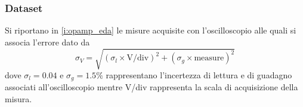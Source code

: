 \documentclass[a4paper,11pt]{article} %
\begin{document}

\subsubsection{Dataset}
Si riportano in  \autoref{i:opamp_eda} le misure acquisite con l'oscilloscopio alle quali si associa l'errore dato da
\begin{equation}\label{e:osc}
	\sigma_{V} = \sqrt{ (\sigma_{l}\times\text{V/div})^2 + (\sigma_{g}\times\text{measure})^2 }
\end{equation}
\noindent dove $\sigma_{l}=0.04$ e $\sigma_{g}=1.5\%$ rappresentano l'incertezza di lettura e di guadagno associati
all'oscilloscopio mentre V/div rappresenta la scala di acquisizione della misura.
\end{document}
